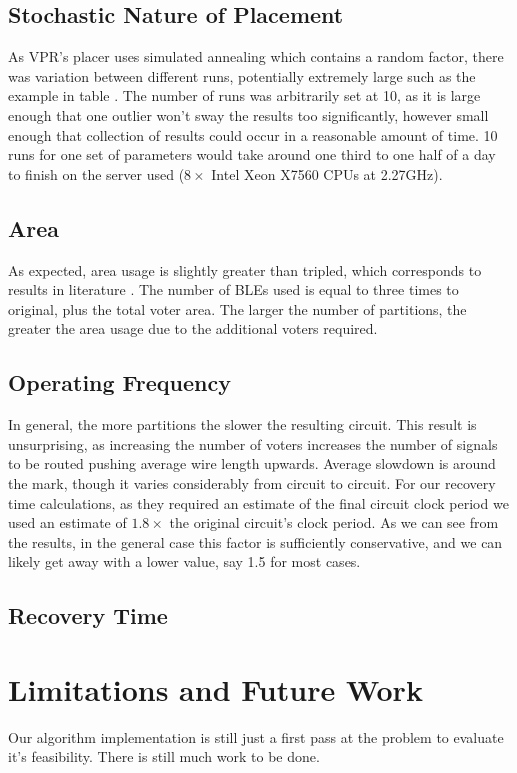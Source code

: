 \documentclass[12pt,final,oneside]{dwThesis} %
\begin{document}
   \section{Stochastic Nature of Placement}
   As \ac{VPR}'s placer uses simulated annealing which contains a random factor, there was variation between different runs, potentially extremely large such as the example in table .
   The number of runs was arbitrarily set at 10, as it is large enough that one outlier won't sway the results too significantly, however small enough that collection of results could occur in a reasonable amount of time. 10 runs for one set of parameters would take around one third to one half of a day to finish on the server used ($8\times$ Intel Xeon X7560 CPUs at 2.27GHz).

   \section{Area}
   As expected, area usage is slightly greater than tripled, which corresponds to results in literature \cite{HardeningTechniques}. The number of \acp{BLE} used is equal to three times to original, plus the total voter area. The larger the number of partitions, the greater the area usage due to the additional voters required.

   \section{Operating Frequency}
   In general, the more partitions the slower the resulting circuit. This result is unsurprising, as increasing the number of voters increases the number of signals to be routed pushing average wire length upwards. Average slowdown is around the  mark, though it varies considerably from circuit to circuit.
   For our recovery time calculations, as they required an estimate of the final circuit clock period we used an estimate of $1.8\times$ the original circuit's clock period. As we can see from the results, in the general case this factor is sufficiently conservative, and we can likely get away with a lower value, say 1.5 for most cases.

   \section{Recovery Time}


   \chapter{Limitations and Future Work}
   Our algorithm implementation is still just a first pass at the problem to evaluate it's feasibility. There is still much work to be done.
   
\end{document}
